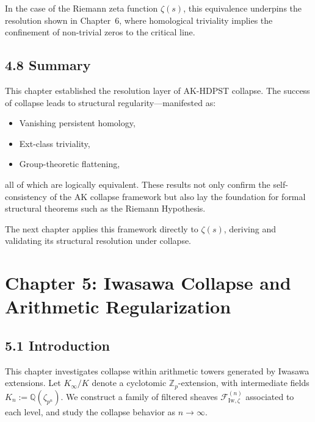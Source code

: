 \documentclass[11pt]{article}
\begin{document}
In the case of the Riemann zeta function \( \zeta(s) \), this equivalence underpins the resolution shown in Chapter~6, where homological triviality implies the confinement of non-trivial zeros to the critical line.

\subsection*{4.8 Summary}

This chapter established the resolution layer of AK-HDPST collapse. The success of collapse leads to structural regularity—manifested as:

\begin{itemize}
  \item Vanishing persistent homology,
  \item Ext-class triviality,
  \item Group-theoretic flattening,
\end{itemize}

all of which are logically equivalent. These results not only confirm the self-consistency of the AK collapse framework but also lay the foundation for formal structural theorems such as the Riemann Hypothesis.

The next chapter applies this framework directly to \( \zeta(s) \), deriving and validating its structural resolution under collapse.



\section*{Chapter 5: Iwasawa Collapse and Arithmetic Regularization}

\subsection*{5.1 Introduction}

This chapter investigates collapse within arithmetic towers generated by Iwasawa extensions. Let \( K_\infty / K \) denote a cyclotomic \( \mathbb{Z}_p \)-extension, with intermediate fields \( K_n := \mathbb{Q}(\zeta_{p^n}) \). We construct a family of filtered sheaves \( \mathcal{F}_{\mathrm{Iw}, \zeta}^{(n)} \) associated to each level, and study the collapse behavior as \( n \to \infty \).
\end{document}
